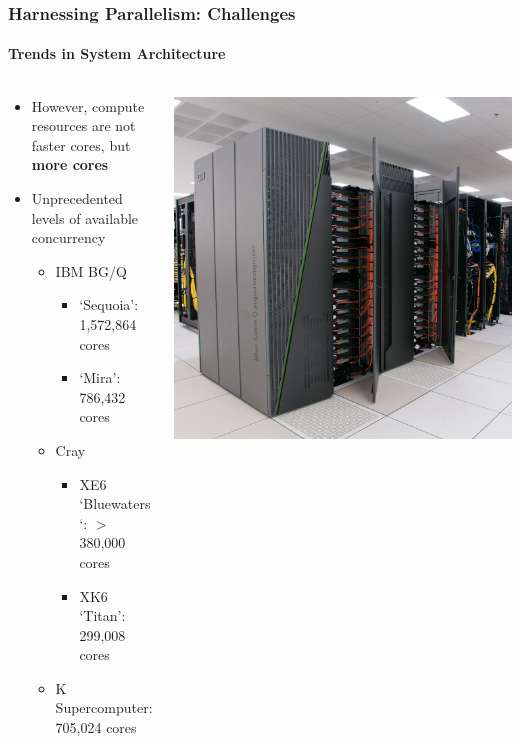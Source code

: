 \begin{frame}[shrink]
\frametitle{Harnessing Parallelism: Challenges}
\framesubtitle{Trends in System Architecture}
  \begin{columns}
    \begin{column}{0.60\textwidth}
      \begin{itemize}
      \item However, compute resources are not faster cores, but \textbf{more cores}
      \item Unprecedented levels of available concurrency
        \begin{itemize}
        \item IBM BG/Q
          \begin{itemize}
          \item `Sequoia': 1,572,864 cores
          \item `Mira': 786,432 cores
          \end{itemize}
        \item Cray
          \begin{itemize}
          \item XE6 `Bluewaters`: $>$ 380,000 cores
          \item XK6 `Titan': 299,008 cores
          \end{itemize}
        \item K Supercomputer: 705,024 cores
        \end{itemize}
      \end{itemize}
    \end{column}
    \begin{column}{0.40\textwidth}
      \includegraphics[width=1\textwidth]{figures/mira.jpg}
    \end{column}
  \end{columns}


\end{frame}
